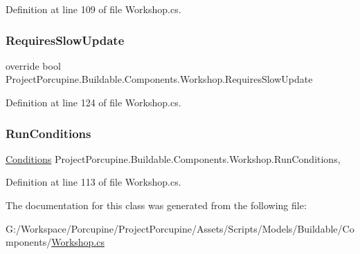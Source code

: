 Definition at line 109 of file Workshop.\+cs.

\mbox{\label{class_project_porcupine_1_1_buildable_1_1_components_1_1_workshop_a64a55c81a9fa14f7ec1644d4df482a13}} 
\subsubsection{\texorpdfstring{Requires\+Slow\+Update}{RequiresSlowUpdate}}
{\footnotesize\ttfamily override bool Project\+Porcupine.\+Buildable.\+Components.\+Workshop.\+Requires\+Slow\+Update\hspace{0.3cm}{\ttfamily [get]}}



Definition at line 124 of file Workshop.\+cs.

\mbox{\label{class_project_porcupine_1_1_buildable_1_1_components_1_1_workshop_abaea7b615e40b9512cbbe2b5d7c4a4b0}} 
\subsubsection{\texorpdfstring{Run\+Conditions}{RunConditions}}
{\footnotesize\ttfamily \hyperlink{class_project_porcupine_1_1_buildable_1_1_components_1_1_buildable_component_1_1_conditions}{Conditions} Project\+Porcupine.\+Buildable.\+Components.\+Workshop.\+Run\+Conditions\hspace{0.3cm}{\ttfamily [get]}, {\ttfamily [set]}}



Definition at line 113 of file Workshop.\+cs.



The documentation for this class was generated from the following file\+:\begin{DoxyCompactItemize}
\item 
G\+:/\+Workspace/\+Porcupine/\+Project\+Porcupine/\+Assets/\+Scripts/\+Models/\+Buildable/\+Components/\hyperlink{_workshop_8cs}{Workshop.\+cs}\end{DoxyCompactItemize}

